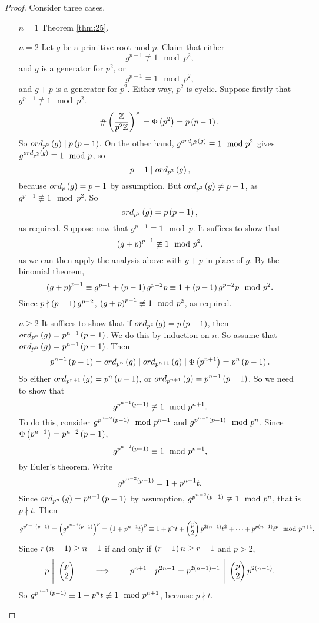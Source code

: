 \begin{proof}
Consider three cases.
\begin{itemize}[leftmargin=0.5in]
\item[$ n = 1 $] Theorem \ref{thm:25}.
\item[$ n = 2 $] Let $ g $ be a primitive root mod $ p $. Claim that either
$$ g^{p - 1} \not\equiv 1 \mod p^2, $$
and $ g $ is a generator for $ \unit{p^2} $, or
$$ g^{p - 1} \equiv 1 \mod p^2, $$
and $ g + p $ is a generator for $ \unit{p^2} $. Either way, $ \unit{p^2} $ is cyclic. Suppose firstly that $ g^{p - 1} \not\equiv 1 \mod p^2 $.
$$ \#\left( \dfrac{\mathbb{Z}}{p^2\mathbb{Z}} \right)^\times = \Phi\left( p^2 \right) = p\left( p - 1 \right). $$
So $ ord_{p^2}\left( g \right) \mid p\left( p - 1 \right) $. On the other hand, $ g^{ord_{p^2}\left( g \right)} \equiv 1 \mod p^2 $ gives $ g^{ord_{p^2}\left( g \right)} \equiv 1 \mod p $, so
$$ p - 1 \mid ord_{p^2}\left( g \right), $$
because $ ord_p\left( g \right) = p - 1 $ by assumption. But $ ord_{p^2}\left( g \right) \ne p - 1 $, as $ g^{p - 1} \not\equiv 1 \mod p^2 $. So
$$ ord_{p^2}\left( g \right) = p\left( p - 1 \right), $$
as required. Suppose now that $ g^{p - 1} \equiv 1 \mod p $. It suffices to show that
$$ \left( g + p \right)^{p - 1} \not\equiv 1 \mod p^2, $$
as we can then apply the analysis above with $ g + p $ in place of $ g $. By the binomial theorem,
$$ \left( g + p \right)^{p - 1} \equiv g^{p - 1} + \left( p - 1 \right)g^{p - 2}p \equiv 1 + \left( p - 1 \right)g^{p - 2}p \mod p^2. $$
Since $ p \nmid \left( p - 1 \right)g^{p - 2} $, $ \left( g + p \right)^{p - 1} \not\equiv 1 \mod p^2 $, as required.
\item[$ n \ge 2 $] It suffices to show that if $ ord_{p^2}\left( g \right) = p\left( p - 1 \right) $, then $ ord_{p^n}\left( g \right) = p^{n - 1}\left( p - 1 \right) $. We do this by induction on $ n $. So assume that $ ord_{p^n}\left( g \right) = p^{n - 1}\left( p - 1 \right) $. Then
$$ p^{n - 1}\left( p - 1 \right) = ord_{p^n}\left( g \right) \mid ord_{p^{n + 1}}\left( g \right) \mid \Phi\left( p^{n + 1} \right) = p^n\left( p - 1 \right). $$
So either $ ord_{p^{n + 1}}\left( g \right) = p^n\left( p - 1 \right) $, or $ ord_{p^{n + 1}}\left( g \right) = p^{n - 1}\left( p - 1 \right) $. So we need to show that
$$ g^{p^{n - 1}\left( p - 1 \right)} \not\equiv 1 \mod p^{n + 1}. $$
To do this, consider $ g^{p^{n - 2}\left( p - 1 \right)} \mod p^{n - 1} $ and $ g^{p^{n - 2}\left( p - 1 \right)} \mod p^n $. Since $ \Phi\left( p^{n - 1} \right) = p^{n - 2}\left( p - 1 \right) $,
$$ g^{p^{n - 2}\left( p - 1 \right)} \equiv 1 \mod p^{n - 1}, $$
by Euler's theorem. Write
$$ g^{p^{n - 2}\left( p - 1 \right)} = 1 + p^{n - 1}t. $$
Since $ ord_{p^n}\left( g \right) = p^{n - 1}\left( p - 1 \right) $ by assumption, $ g^{p^{n - 2}\left( p - 1 \right)} \not\equiv 1 \mod p^n $, that is $ p \nmid t $. Then
$$ g^{p^{n - 1}\left( p - 1 \right)} = \left( g^{p^{n - 2}\left( p - 1 \right)} \right)^p = \left( 1 + p^{n - 1}t \right)^p \equiv 1 + p^nt + \begin{pmatrix} p \\ 2 \end{pmatrix}p^{2\left( n - 1 \right)}t^2 + \dots + p^{p\left( n - 1 \right)}t^p \mod p^{n + 1}, $$
Since $ r\left( n - 1 \right) \ge n + 1 $ if and only if $ \left( r - 1 \right)n \ge r + 1 $ and $ p > 2 $,
$$ p \ \Bigg| \ \twobyone{p}{2} \qquad \implies \qquad p^{n + 1} \ \Bigg| \ p^{2n - 1} = p^{2\rb{n - 1} + 1} \ \Bigg| \ \twobyone{p}{2}p^{2\rb{n - 1}}. $$
So $ g^{p^{n - 1}\left( p - 1 \right)} \equiv 1 + p^nt \not\equiv 1 \mod p^{n + 1} $, because $ p \nmid t $.
\end{itemize}
\end{proof}

